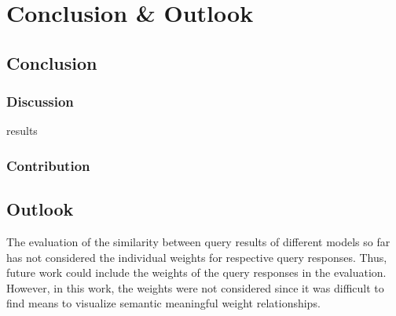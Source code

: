 \chapter{Conclusion \& Outlook}\label{ch:conclusion-outlook}

\section{Conclusion}\label{sec:conclusion}

\subsection{Discussion}\label{subsec:discussion}
results

\subsection{Contribution}\label{subsec:contribution}





\section{Outlook}\label{sec:outlook}



The evaluation of the similarity between query results of different models so far has not considered the individual weights for respective query responses.
Thus, future work could include the weights of the query responses in the evaluation.
However, in this work, the weights were not considered since it was difficult to find means to visualize semantic meaningful weight relationships.

